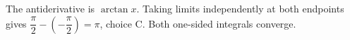The antiderivative is $\arctan x$. Taking limits independently at both endpoints gives $\dfrac{\pi}{2}-(-\dfrac{\pi}{2})=\boxed\pi$, choice C. Both one-sided integrals converge.
